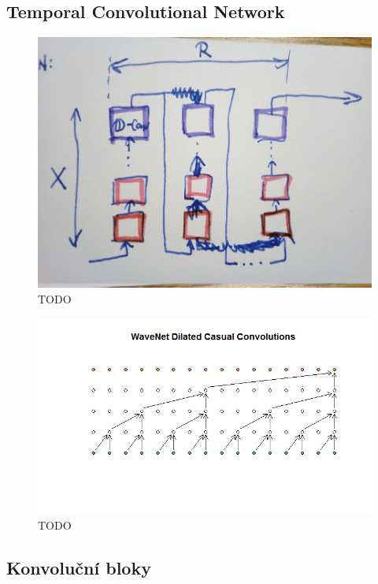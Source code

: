 \subsection{Temporal Convolutional Network}
\begin{figure}[H]
    \centering
    \includegraphics[scale=0.35]{obrazky-figures/stacked_resblocks.jpg}
    \caption{\label{fig:tasnet-stacked-resblocks}TODO}
\end{figure}

\begin{figure}[H]
    \centering
    \includegraphics[scale=0.35]{obrazky-figures/causal_dilation.png}
    \caption{\label{fig:tasnet-causal-dilation}TODO}
\end{figure}


\subsection{Konvoluční bloky}

